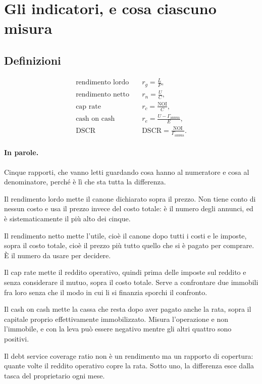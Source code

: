 \documentclass[11pt,a4paper]{article}
\theoremstyle{definition}
\theoremstyle{plain}
\begin{document}
\section{Gli indicatori, e cosa ciascuno misura}

\subsection{Definizioni}

\begin{align}
\text{rendimento lordo} \quad & r_g = \frac{L}{P}, \label{eq:lordo}\\
\text{rendimento netto} \quad & r_n = \frac{U}{C}, \label{eq:netto}\\
\text{cap rate} \quad & r_c = \frac{\mathrm{NOI}}{C}, \label{eq:cap}\\
\text{cash on cash} \quad & r_e = \frac{U - \Gamma_{\text{annua}}}{E}, \label{eq:coc}\\
\text{DSCR} \quad & \mathrm{DSCR} = \frac{\mathrm{NOI}}{\Gamma_{\text{annua}}}. \label{eq:dscr}
\end{align}

\paragraph{In parole.} Cinque rapporti, che vanno letti guardando cosa hanno al numeratore e cosa al denominatore, perché è lì che sta tutta la differenza.

Il rendimento lordo mette il canone dichiarato sopra il prezzo. Non tiene conto di nessun costo e usa il prezzo invece del costo totale: è il numero degli annunci, ed è sistematicamente il più alto dei cinque.

Il rendimento netto mette l'utile, cioè il canone dopo tutti i costi e le imposte, sopra il costo totale, cioè il prezzo più tutto quello che si è pagato per comprare. È il numero da usare per decidere.

Il cap rate mette il reddito operativo, quindi prima delle imposte sul reddito e senza considerare il mutuo, sopra il costo totale. Serve a confrontare due immobili fra loro senza che il modo in cui li si finanzia sporchi il confronto.

Il cash on cash mette la cassa che resta dopo aver pagato anche la rata, sopra il capitale proprio effettivamente immobilizzato. Misura l'operazione e non l'immobile, e con la leva può essere negativo mentre gli altri quattro sono positivi.

Il debt service coverage ratio non è un rendimento ma un rapporto di copertura: quante volte il reddito operativo copre la rata. Sotto uno, la differenza esce dalla tasca del proprietario ogni mese.
\end{document}
